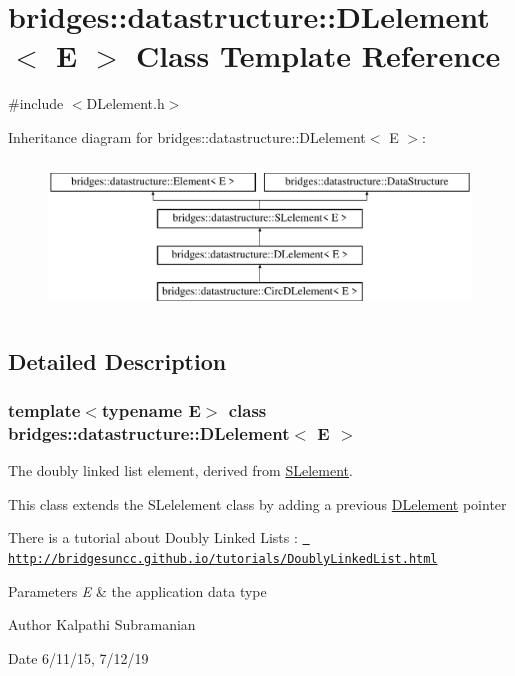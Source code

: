 \hypertarget{classbridges_1_1datastructure_1_1_d_lelement}{}\section{bridges\+::datastructure\+::D\+Lelement$<$ E $>$ Class Template Reference}
\label{classbridges_1_1datastructure_1_1_d_lelement}


{\ttfamily \#include $<$D\+Lelement.\+h$>$}

Inheritance diagram for bridges\+::datastructure\+::D\+Lelement$<$ E $>$\+:\begin{figure}[H]
\begin{center}
\leavevmode
\includegraphics[height=4.000000cm]{classbridges_1_1datastructure_1_1_d_lelement}
\end{center}
\end{figure}


\subsection{Detailed Description}
\subsubsection*{template$<$typename E$>$\newline
class bridges\+::datastructure\+::\+D\+Lelement$<$ E $>$}

The doubly linked list element, derived from \mbox{\hyperlink{classbridges_1_1datastructure_1_1_s_lelement}{S\+Lelement}}. 

This class extends the S\+Lelelement class by adding a previous \mbox{\hyperlink{classbridges_1_1datastructure_1_1_d_lelement}{D\+Lelement}} pointer

There is a tutorial about Doubly Linked Lists \+: \href{http://bridgesuncc.github.io/tutorials/DoublyLinkedList.html}{\texttt{ http\+://bridgesuncc.\+github.\+io/tutorials/\+Doubly\+Linked\+List.\+html}}


\begin{DoxyParams}{Parameters}
{\em E} & the application data type\\
\hline
\end{DoxyParams}
\begin{DoxyAuthor}{Author}
Kalpathi Subramanian 
\end{DoxyAuthor}
\begin{DoxyDate}{Date}
6/11/15, 7/12/19 
\end{DoxyDate}
